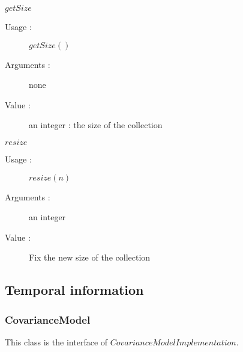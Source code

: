 \begin{description}
\begin{description}
  \item $getSize$
    \begin{description}
    \item[Usage :] $getSize()$
    \item[Arguments :] none
    \item[Value :] an integer : the size of the collection
    \end{description}
    \bigskip


  \item $resize$
    \begin{description}
    \item[Usage :] $resize(n)$
    \item[Arguments :] an integer
    \item[Value :] Fix the new size of the collection
    \end{description}
    \bigskip

  \end{description}

\end{description}






\newpage \subsection{Temporal information}


\subsubsection{CovarianceModel}

This class is the interface of $CovarianceModelImplementation$. 

